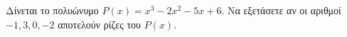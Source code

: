 Δίνεται το πολυώνυμο $ P(x)=x^3-2x^2-5x+6 $. Να εξετάσετε αν οι αριθμοί $ -1,3,0,-2 $ αποτελούν ρίζες του $P(x)$.
